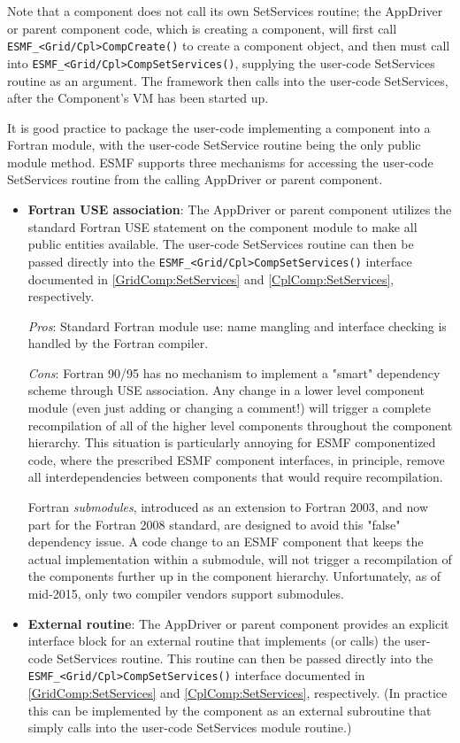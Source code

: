 Note that a component does not call its own SetServices routine;
the AppDriver or parent component code, which is creating a component, 
will first call {\tt ESMF\_<Grid/Cpl>CompCreate()} to create a component object, and then must call into {\tt ESMF\_<Grid/Cpl>CompSetServices()}, supplying the user-code SetServices routine as an argument. The framework then calls into the user-code SetServices, after the Component's VM has been started up.

It is good practice to package the user-code implementing a component into a Fortran module, with the user-code SetService routine being the only public module method. ESMF supports three mechanisms for accessing the user-code SetServices routine from the calling AppDriver or parent component.

\begin{itemize}
\item {\bf Fortran USE association}: The AppDriver or parent component utilizes the standard Fortran USE statement on the component module to make all public entities available. The user-code SetServices routine can then be passed directly into the {\tt ESMF\_<Grid/Cpl>CompSetServices()} interface documented in \ref{GridComp:SetServices} and \ref{CplComp:SetServices}, respectively.

{\em Pros}: Standard Fortran module use: name mangling and interface checking is handled by the Fortran compiler.

{\em Cons}: Fortran 90/95 has no mechanism to implement a "smart" dependency scheme through USE association. Any change in a lower level component module (even just adding or changing a comment!) will trigger a complete recompilation of all of the higher level components throughout the component hierarchy. This situation is particularly annoying for ESMF componentized code, where the prescribed ESMF component interfaces, in principle, remove all interdependencies between components that would require recompilation.

Fortran {\em submodules}, introduced as an extension to Fortran 2003, and now part for the Fortran 2008 standard, are designed to avoid this "false" dependency issue. A code change to an ESMF component that keeps the actual implementation within a submodule, will not trigger a recompilation of the components further up in the component hierarchy. Unfortunately, as of mid-2015, only two compiler vendors support submodules.

\item {\bf External routine}: The AppDriver or parent component provides an explicit interface block for an external routine that implements (or calls) the user-code SetServices routine. This routine can then be passed directly into the {\tt ESMF\_<Grid/Cpl>CompSetServices()} interface documented in \ref{GridComp:SetServices} and \ref{CplComp:SetServices}, respectively. (In practice this can be implemented by the component as an external subroutine that simply calls into the user-code SetServices module routine.)


\end{itemize}
